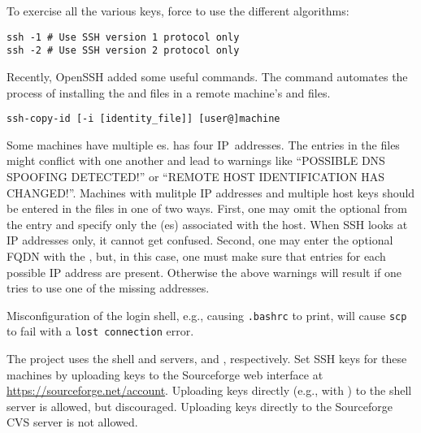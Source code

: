 \documentclass[12pt,twoside]{article}
\begin{document}
To exercise all the various keys, force  to use the
different algorithms:
\begin{verbatim}
ssh -1 # Use SSH version 1 protocol only
ssh -2 # Use SSH version 2 protocol only
\end{verbatim}

Recently, OpenSSH added some useful commands.
The command  automates the process of installing
the  and  files in a remote
machine's  and  files. 
\begin{verbatim}
ssh-copy-id [-i [identity_file]] [user@]machine
\end{verbatim}

Some machines have multiple es.
 has four IP~addresses.
The entries in the  files might conflict with one
another and lead to warnings like ``POSSIBLE DNS SPOOFING DETECTED!''
or ``REMOTE HOST IDENTIFICATION HAS CHANGED!''.
Machines with mulitple IP addresses and multiple host keys should
be entered in the  files in one of two ways.
First, one may omit the optional  from the entry and
specify only the (es) associated with the host.
When SSH looks at IP addresses only, it cannot get confused.
Second, one may enter the optional FQDN with the ,
but, in this case, one must make sure that entries for each possible
IP address are present.
Otherwise the above warnings will result if one tries to use one of
the missing addresses.

Misconfiguration of the login shell, e.g., causing \verb'.bashrc' to
print, will cause \verb'scp' to fail with a \verb'lost connection'
error. 

The  project uses the  shell and
 servers,  and ,
respectively. 
Set SSH keys for these machines by uploading keys to the Sourceforge
web interface at \url{https://sourceforge.net/account}. 
Uploading keys directly (e.g., with ) to the shell server
is allowed, but discouraged.
Uploading keys directly to the Sourceforge CVS server is not allowed.
\end{document}
